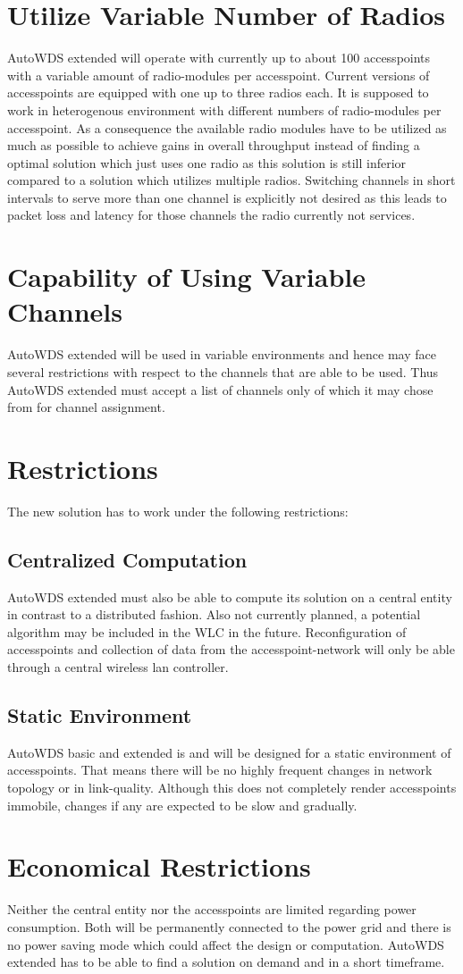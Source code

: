   \section{Utilize Variable Number of Radios}
  AutoWDS extended will operate with currently up to about 100 accesspoints with a variable amount of radio-modules per accesspoint.
  Current versions of accesspoints are equipped with one up to three radios each. It is supposed to work in heterogenous environment with 
  different numbers of radio-modules per accesspoint. As a consequence the available radio modules 
  have to be utilized as much as possible to achieve gains in overall throughput instead of finding a optimal solution which just uses one radio as this solution is
  still inferior compared to a solution which utilizes multiple radios.
  Switching channels in short intervals to serve more than one channel is explicitly not desired as this leads to packet loss and latency for those channels the radio
  currently not services.
  \section{Capability of Using Variable Channels}
  AutoWDS extended will be used in variable environments and hence may face several restrictions with respect to the channels that are able to be used.
  Thus AutoWDS extended must accept a list of channels only of which it may chose from for channel assignment.
  \section{Restrictions}
    The new solution has to work under the following restrictions:
    \subsection{Centralized Computation}
      AutoWDS extended must also be able to compute its solution on a central entity in contrast to a distributed fashion.
      Also not currently planned, a potential algorithm may be included in the WLC in the future.
      Reconfiguration of accesspoints and collection of data from the accesspoint-network will only be able through a central wireless lan controller.
    \subsection{Static Environment}
      AutoWDS basic and extended is and will be designed for a static environment of accesspoints. That means there will be no highly frequent changes in
      network topology or in link-quality. Although this does not completely render accesspoints immobile, changes if any are expected to be slow and gradually.
\section{Economical Restrictions}
  Neither the central entity nor the accesspoints are limited regarding power consumption. 
  Both will be permanently connected to the power grid and there is no power saving mode which could affect the design or computation.
  AutoWDS extended has to be able to find a solution on demand and in a short timeframe.